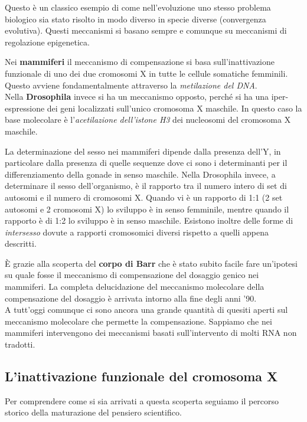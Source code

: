 \documentclass[11pt]{book}
\begin{document}
Questo è un classico esempio di come nell’evoluzione uno stesso problema biologico sia stato risolto in modo diverso in specie diverse (convergenza evolutiva). Questi meccanismi si basano sempre e comunque su meccanismi di regolazione epigenetica.

Nei \textbf{mammiferi} il meccanismo di compensazione si basa sull’inattivazione funzionale di uno dei due cromosomi X in tutte le cellule somatiche femminili. Questo avviene fondamentalmente attraverso la \emph{metilazione del DNA}. \\
Nella \textbf{Drosophila} invece si ha un meccanismo opposto, perché si ha una iper-espressione dei geni localizzati sull’unico cromosoma X maschile.
In questo caso la base molecolare è l’\emph{acetilazione dell’istone H3} dei nucleosomi del cromosoma X maschile. 

La determinazione del sesso nei mammiferi dipende dalla presenza dell’Y, in particolare dalla presenza di quelle sequenze dove ci sono i determinanti per il differenziamento della gonade in senso maschile. Nella Drosophila invece, a determinare il sesso dell'organismo, è il rapporto tra il numero intero di set di autosomi e il numero di cromosomi X. Quando vi è un rapporto di 1:1 (2 set autosomi e 2 cromosomi X) lo sviluppo è in senso femminile, mentre quando il rapporto è di 1:2 lo sviluppo è in senso maschile. Esistono inoltre delle forme di \emph{intersesso} dovute a rapporti cromosomici diversi rispetto a quelli appena descritti.

È grazie alla scoperta del \textbf{corpo di Barr} che è stato subito facile fare un’ipotesi su quale fosse il meccanismo di compensazione del dosaggio genico nei mammiferi. La completa delucidazione del meccanismo molecolare della compensazione del dosaggio è arrivata intorno alla fine degli anni '90.\\
A tutt’oggi comunque ci sono ancora una grande quantità di quesiti aperti sul meccanismo molecolare che permette la compensazione.
Sappiamo che nei mammiferi intervengono dei meccanismi basati sull’intervento di molti RNA non tradotti.\\

\subsection{L'inattivazione funzionale del cromosoma X}
Per comprendere come si sia arrivati a questa scoperta seguiamo il percorso storico della maturazione del pensiero scientifico.
\end{document}
